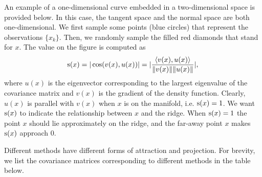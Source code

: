 \documentclass[aos,preprint]{imsart}
\theoremstyle{remark}
\begin{document}
An example of a one-dimensional curve embedded in a two-dimensional space is provided below. In this case, the tangent space and the normal space are both one-dimensional.
We first sample some points (blue circles) that represent the observations $\{x_k\}$. Then, we randomly sample the filled red diamonds that stand for $x$. The value on the figure is computed as
\[
{\rm s}(x) =  |\cos(v(x),u(x))| = |\frac{\langle v(x), u(x) \rangle}{\|v(x)\|\|u(x)\|}|,
\]
where $u(x)$ is the eigenvector corresponding to the largest eigenvalue of the covariance matrix and $v(x)$ is the gradient of the density function. Clearly, $u(x)$ is parallel with $v(x)$ when $x$ is on the manifold, i.e. ${\rm s}(x)=1$. We want ${\rm s}(x)$ to indicate the relationship between $x$ and the ridge. When ${\rm s}(x)=1$ the point $x$ should lie approximately on the ridge, and the far-away point $x$ makes ${\rm s}(x)$ approach $0$.

Different methods have different forms of attraction and projection. For brevity, we list the covariance matrices corresponding to different methods in the table below.
% 
 
\end{document}
